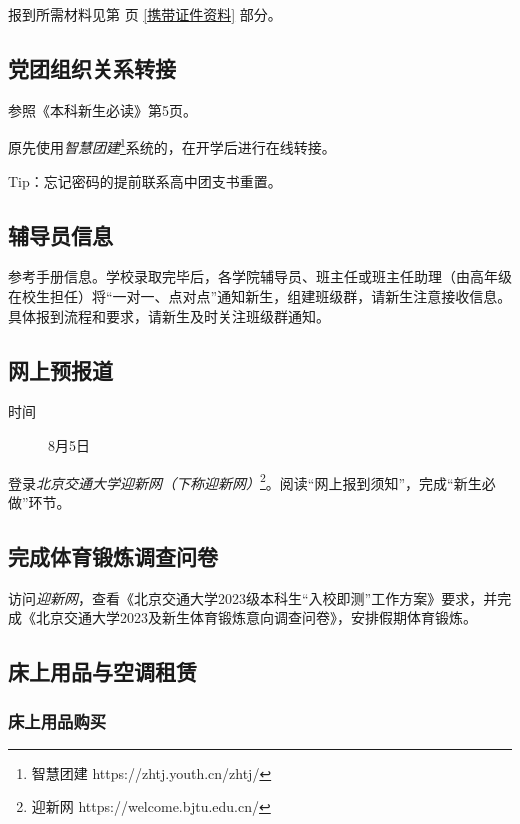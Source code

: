\documentclass[a4paper]{ctexart}
\begin{document}
	报到所需材料见第\pageref{携带证件资料} 页 \ref{携带证件资料} 部分。

\subsection{党团组织关系转接}

参照《本科新生必读》第5页。

原先使用\textit{智慧团建}\footnote{智慧团建 https://zhtj.youth.cn/zhtj/}系统的，在开学后进行在线转接。

Tip：忘记密码的提前联系高中团支书重置。

\subsection{辅导员信息}

参考手册信息。学校录取完毕后，各学院辅导员、班主任或班主任助理（由高年级在校生担任）将“一对一、点对点”通知新生，组建班级群，请新生注意接收信息。具体报到流程和要求，请新生及时关注班级群通知。

\subsection{网上预报道}

\begin{description}
	\item[时间] 8月5日
\end{description}

登录\textit{北京交通大学迎新网（下称迎新网）}\footnote{迎新网 https://welcome.bjtu.edu.cn/}。阅读“网上报到须知”，完成“新生必做”环节。

\subsection{完成体育锻炼调查问卷}

访问\textit{迎新网}，查看《北京交通大学2023级本科生“入校即测”工作方案》要求，并完成《北京交通大学2023及新生体育锻炼意向调查问卷》，安排假期体育锻炼。

\subsection{床上用品与空调租赁}

\subsubsection{床上用品购买}
\end{document}
